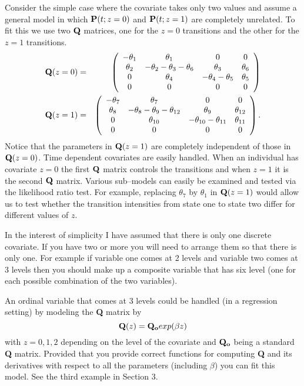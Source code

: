 \documentclass[12pt]{article}
\begin{document}
Consider the simple case where the covariate takes only two values and
assume a general model in which ${\bf P}(t;z=0)$ and ${\bf P}(t;z=1)$
are completely unrelated. 
To fit this we use two ${\bf Q}$ matrices, one for the $z=0$ transitions and
the other for the $z=1$ transitions.
\begin{eqnarray}
{\bf Q}(z=0) & = & 
\left( \begin{array}{cccc}
 - \theta_1 & \theta_1 & 0 & 0 \\
  \theta_2 & -\theta_2-\theta_3-\theta_6 & \theta_3 & \theta_6 \\
 0 & \theta_4 & -\theta_4-\theta_5 & \theta_5 \\
 0 & 0 & 0 & 0 \\
\end{array}
\right) \\
{\bf Q}(z=1) & = & 
\left( \begin{array}{cccc}
 - \theta_7 & \theta_7 & 0 & 0 \\
  \theta_8 & -\theta_8-\theta_9-\theta_{12} & \theta_9 & \theta_{12} \\
 0 & \theta_{10} & -\theta_{10}-\theta_{11} & \theta_{11} \\
 0 & 0 & 0 & 0 \\
\end{array}
\right).
\end{eqnarray}
Notice that the parameters in ${\bf Q}(z=1)$ are completely independent of those
in ${\bf Q}(z=0)$.
Time dependent covariates are easily handled. When an individual has covariate $z=0$
the first ${\bf Q}$ matrix controls the transitions and when $z=1$ it is the second
${\bf Q}$ matrix.
Various sub--models can easily be examined and tested via the likelihood ratio test.
For example, replacing $\theta_7$ by $\theta_1$ in ${\bf Q}(z=1)$ would allow
us to test whether the transition intensities from state one to state two differ
for different values of $z$.
 
In the interest of simplicity I have assumed that there is only one discrete 
covariate.
If you have two or more you will need to arrange them so that there is only
one.
For example if variable one comes at 2 levels and variable two comes at 3
levels then you should make up a composite variable that has six level
(one for each possible combination of the two variables).

An ordinal variable that comes at 3 levels could be handled (in a regression
setting) by modeling the {\bf Q} matrix by 
\[
{\bf Q}(z)= {\bf Q_o} exp(\beta z)
\]
with $z=0,1,2$ depending on the level of the covariate and ${\bf Q_o}$
being a standard {\bf Q} matrix.
Provided that you provide correct functions for computing {\bf Q} and
its derivatives with respect to all the parameters (including $\beta$)
you can fit this model.
See the third example in Section 3.
\end{document}
